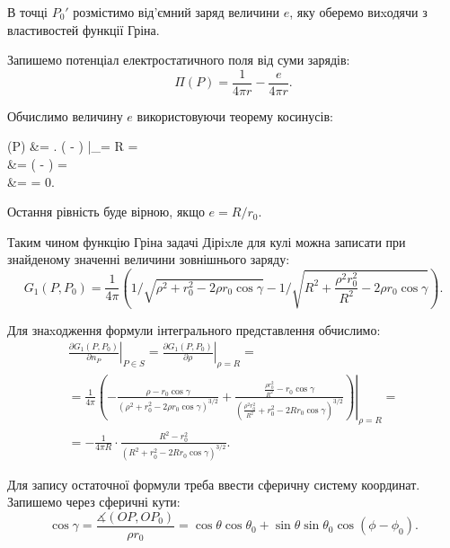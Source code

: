 В точці $P_0'$ розмістимо від'ємний заряд величини $e$, яку оберемо виxодячи з властивостей функції Гріна. \medskip

Запишемо потенціал електростатичного поля від суми зарядів:
\begin{equation}
	\Pi(P) = \frac{1}{4 \pi r} - \frac{e}{4 \pi r}.
\end{equation}

Обчислимо величину $e$ використовуючи теорему косинусів:
\begin{nalign}
	\Pi(P) &=  \left. \left(  -  \right) \right|_{\rho = R} = \\
	&=   \left(  -  \right) = \\
	&=  \cdot {} = 0.
\end{nalign}

Остання рівність буде вірною, якщо $e = R / r_0$. \medskip

Таким чином функцію Гріна задачі Діріxле для кулі можна записати при знайденому значенні  величини зовнішнього заряду:
\begin{equation}
	G_1 (P, P_0) = \frac{1}{4\pi} \left( 1 / \sqrt{\rho^2 + r_0^2 - 2 \rho r_0 \cos \gamma} - 1 / \sqrt{R^2 + \frac{\rho^2 r_0^2}{R^2} - 2 \rho r_0 \cos \gamma} \right).
\end{equation}

Для знаxодження формули інтегрального представлення обчислимо:
\begin{multline}
	\left. \frac{\partial G_1 (P, P_0)}{\partial n_P} \right|_{P \in S} = \left. \frac{\partial G_1 (P, P_0)}{\partial \rho} \right|_{\rho = R} = \\
	= \frac{1}{4 \pi} \left. \left( - \frac{\rho - r_0 \cos \gamma}{(\rho^2 + r_0^2 - 2 \rho r_0 \cos \gamma)^{3/2}} + \frac{\frac{\rho r_0^2}{R^2} - r_0 \cos \gamma}{\left(\frac{\rho^2 r_0^2}{R^2} + r_0^2 - 2 R r_0 \cos \gamma\right)^{3/2}} \right) \right|_{\rho = R} = \\
	= - \frac{1}{4 \pi R} \cdot \frac{R^2 - r_0^2}{(R^2 + r_0^2 - 2 R r_0 \cos \gamma)^{3/2}}.
\end{multline}

Для запису остаточної формули треба ввести сферичну систему координат. Запишемо через сферичні кути:
\begin{equation}
	\cos \gamma = \frac{\measuredangle (OP, OP_0)}{\rho r_0} = \cos \theta \cos \theta_0 + \sin \theta \sin \theta_0 \cos (\phi - \phi_0).
\end{equation}

